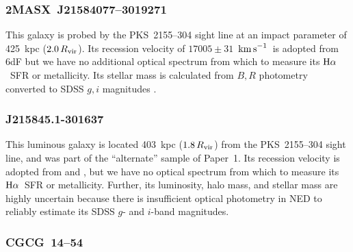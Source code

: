 \documentclass[twocolumn,twocolappendix,tighten,times]{aastex6}
\newcommand{\Ha}{\ensuremath{{\rm H}\alpha}}
\newcommand{\kms}{\ensuremath{{\rm km\,s}^{-1}}}
\begin{document}
\subsubsection{2MASX~J21584077--3019271}
\label{indiv:galaxies:2masxj2158-30}

This galaxy is probed by the PKS~2155--304 sight line at an impact parameter of 
425~kpc ($2.0\,R_{\rm vir}$). Its recession velocity of $17005\pm31$~\kms\ is 
adopted from 6dF \citep{jones05} but we have no additional optical spectrum 
from which to measure its \Ha\ SFR or metallicity. Its stellar mass is calculated 
from $B,R$ photometry \citep{prochaska11b} converted to SDSS $g,i$ magnitudes 
\citep{jester05}.






\subsubsection{J215845.1-301637}
\label{indiv:galaxies:j2158-30}

This luminous galaxy is located 403~kpc ($1.8\,R_{\rm vir}$) from the PKS~2155--304
sight line, and was part of the ``alternate'' sample of Paper~1. Its recession 
velocity is adopted from \citet{mclin03} and \citet{yao10}, but we have no 
optical spectrum from which to measure its \Ha\ SFR or metallicity. Further, its
luminosity, halo mass, and stellar mass are highly uncertain because there is 
insufficient optical photometry in NED to reliably estimate its SDSS $g$- and 
$i$-band magnitudes.


\subsubsection{CGCG~14--54}
\label{indiv:galaxies:cgcg14-54}
\end{document}
